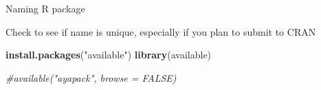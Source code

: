 \documentclass[
  ignorenonframetext,
]{beamer}
\newenvironment{Shaded}{\begin{snugshade}}{\end{snugshade}}
\newcommand{\CommentTok}[1]{\textcolor[rgb]{0.56,0.35,0.01}{\textit{#1}}}
\newcommand{\KeywordTok}[1]{\textcolor[rgb]{0.13,0.29,0.53}{\textbf{#1}}}
\newcommand{\NormalTok}[1]{#1}
\newcommand{\StringTok}[1]{\textcolor[rgb]{0.31,0.60,0.02}{#1}}
\begin{document}
\begin{frame}[fragile]{Naming R package}
\protect\hypertarget{naming-r-package-1}{}

Check to see if name is unique, especially if you plan to submit to CRAN
\footnotesize

\begin{Shaded}
\begin{Highlighting}[]
\KeywordTok{install.packages}\NormalTok{(}\StringTok{"available"}\NormalTok{)}
\KeywordTok{library}\NormalTok{(available)}
\end{Highlighting}
\end{Shaded}

\begin{Shaded}
\begin{Highlighting}[]
\CommentTok{#available("ayapack", browse = FALSE)}
\end{Highlighting}
\end{Shaded}

\end{frame}
\end{document}
